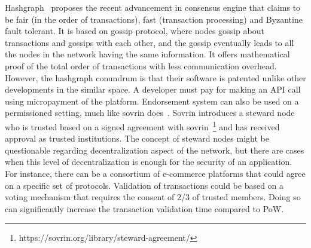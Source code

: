 Hashgraph~\cite{baird2016hashgraph} proposes the recent advancement in
consensus engine that claims to be fair (in the order of transactions), fast
(transaction processing) and Byzantine fault tolerant. It is based on gossip
protocol, where nodes gossip about transactions and gossips with each other,
and the gossip eventually leads to all the nodes in the network having the same
information. It offers mathematical proof of the total order of transactions
with less communication overhead. However, the hashgraph conundrum is that
their software is patented unlike other developments in the similar space. A
developer must pay for making an API call using micropayment of the platform.
Endorsement system can also be used on a permissioned setting, much like sovrin
does~\cite{tobin2016inevitable}. Sovrin introduces a steward node who is
trusted based on a signed agreement with
sovrin~\footnote{https://sovrin.org/library/steward-agreement/} and has
received approval as trusted institutions. The concept of steward nodes might
be questionable regarding decentralization aspect of the network, but there are
cases when this level of decentralization is enough for the security of an
application. For instance, there can be a consortium of e-commerce platforms
that could agree on a specific set of protocols.  Validation of transactions
could be based on a voting mechanism that requires the consent of 2/3 of
trusted members. Doing so can significantly increase the transaction validation
time compared to \ac{PoW}.



